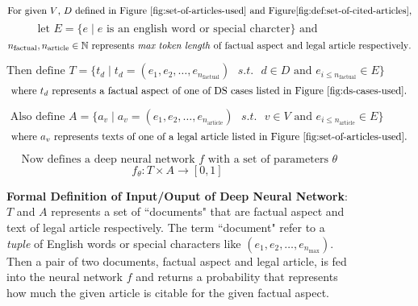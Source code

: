 \begin{figure}[ht]
    \[\text{For given $V$, $D$ defined in Figure \ref{fig:set-of-articles-used} and  Figure\ref{fig:def:set-of-cited-articles},}\]
    \[\text{ let } E = \{e \mid e \text{ is an english word or special charcter} \} \text{ and }\]
    \[n_{\text{factual}}, n_{\text{article}} \in \Bbb N \text{ represents \textit{max token length} of factual aspect and legal article respectively}. \]
    
    \[\text{Then define } T = \{t_d \mid t_d = (e_1, e_2, \ldots , e_{n_\text{factual}}) \text{ } s.t. \text{ } d \in D \text{ and } e_{i \le{n_{\text{factual}}}  } \in E \} \]
    \[\text{ where } t_d \text{ represents a factual aspect of one of DS cases listed in Figure \ref{fig:ds-cases-used}. }\]
    
    \[\text{ Also define } A = \{a_v \mid a_v = (e_1, e_2, \ldots , e_{n_\text{article}}) \text{ } s.t. \text{ } v \in V \text{ and } e_{i \le{n_{\text{article}}}  } \in E \}  \]
    \[\text{ where } a_v \text{ represents texts of one of a legal article listed in Figure \ref{fig:set-of-articles-used}. }\]

    \[\text{ Now defines a deep neural network } f \text{ with a set of parameters } \theta \]
    \[f_{\theta}: T \times A \to [0, 1] \]


    \caption{\textbf{Formal Definition of Input/Ouput of Deep Neural Network}: $T$ and $A$ represents a set of ``documents" that are factual aspect and text of legal article respectively. The term ``document" refer to a \textit{tuple} of English words or special characters like $(e_1, e_2, \ldots, e_{n_\text{max}})$. Then a pair of two documents, factual aspect and legal article, is fed into the neural network $f$ and returns a probability that represents how much the given article is citable for the given factual aspect.}
    \label{fig:def:io:nn}

\end{figure}